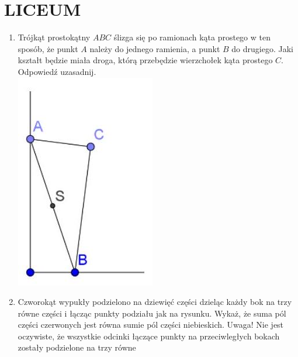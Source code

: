 \documentclass[10pt]{article}
\begin{document}
\section*{LICEUM}
\begin{enumerate}
  \item Trójkąt prostokątny \(A B C\) ślizga się po ramionach kąta prostego w ten sposób, że punkt \(A\) należy do jednego ramienia, a punkt \(B\) do drugiego. Jaki kształt będzie miała droga, którą przebędzie wierzchołek kąta prostego \(C\). Odpowiedź uzasadnij.\\
\includegraphics[max width=\textwidth, center]{2024_11_21_9bcf201a4fb59f89a03bg-1}
  \item Czworokąt wypukły podzielono na dziewięć części dzieląc każdy bok na trzy równe części i łącząc punkty podziału jak na rysunku. Wykaż, że suma pól części czerwonych jest równa sumie pól części niebieskich. Uwaga! Nie jest oczywiste, że wszystkie odcinki łączące punkty na przeciwległych bokach zostały podzielone na trzy równe\\

\end{enumerate}
\end{document}
